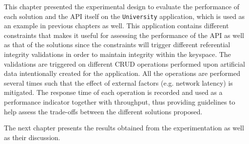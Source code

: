 This chapter  presented the experimental design to evaluate the performance of
each  solution and the  \ac{API} itself on the \texttt{University} application,
which is  used as an example in previous chapters as well. This application
contains different constraints that makes it useful for assessing the
performance of the \ac{API} as well as that of the solutions since the
constraints  will trigger different referential integrity validations in order
to maintain integrity within the keyspace.  The validations are triggered on
different \ac{CRUD} operations performed upon artificial data intentionally
created for the application. All the operations are  performed   several times
such that the effect of external factors (e.g.  network latency) is mitigated.
The response time of each operation is recorded and used as a  performance
indicator together with throughput,  thus providing guidelines to help assess
the trade-offs between the different solutions proposed.


The next chapter presents the results obtained from the experimentation as well 
as their discussion. 
 
\vfill





